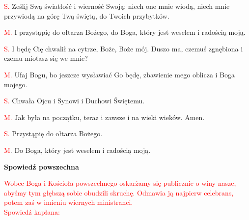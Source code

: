 \begin{Parallel}[v]{0.485\textwidth}{0.485\textwidth}
{\textcolor{red}{S.} \textcolor{my-color}{Ześlij Swą światłość i wierność Swoją: niech one mnie wiodą, niech mnie przywiodą na górę Twą świętą, do Twoich przybytków.}

\textcolor{red}{M.} \textcolor{my-color}{I przystąpię do ołtarza Bożego, do Boga, który jest weselem i radością moją.}

\textcolor{red}{S.} \textcolor{my-color}{I będę Cię chwalił na cytrze, Boże, Boże mój. Duszo ma, czemuś zgnębiona i czemu miotasz się we mnie?}

\textcolor{red}{M.} \textcolor{my-color}{Ufaj Bogu, bo jeszcze wysławiać Go będę, zbawienie mego oblicza i Boga mojego.}

\textcolor{red}{S.} \textcolor{my-color}{Chwała Ojcu i Synowi i Duchowi Świętemu.}

\textcolor{red}{M.} \textcolor{my-color}{Jak była na początku, teraz i zawsze i na wieki wieków. Amen.}

\textcolor{red}{S.} \textcolor{my-color}{Przystąpię do ołtarza Bożego.}

\textcolor{red}{M}. \textcolor{my-color}{Do Boga, który jest weselem i radością moją.}
}
\end{Parallel}

\begin{center}
\textbf{Spowiedź powszechna}
\end{center}

\begin{center}
\textcolor{red}{Wobec Boga i Kościoła powszechnego oskarżamy się publicznie o winy nasze, abyśmy tym głębszą sobie obudzili skruchę. Odmawia ją najpierw celebrans, potem zaś w imieniu wiernych ministranci.\\
Spowiedź kapłana:}
\end{center}

